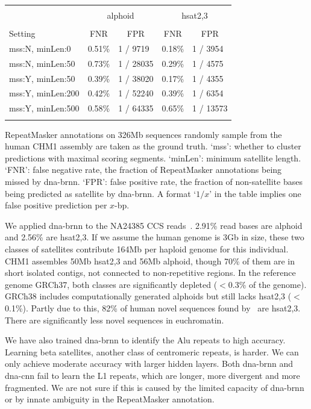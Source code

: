 \documentclass{bioinfo}
\begin{document}
\begin{table}[tb]
{\footnotesize
\begin{tabular}{p{3.3cm}rlrl}
\toprule\\[-1.5em]
& \multicolumn{2}{c}{\vspace{0.3em}alphoid} & \multicolumn{2}{c}{hsat2,3} \\
\cline{2-5}\\[-0.7em]
Setting & \multicolumn{1}{c}{FNR} & \multicolumn{1}{c}{FPR} & \multicolumn{1}{c}{FNR} & \multicolumn{1}{c}{FPR} \\[-0.5em]
\midrule
mss:N, minLen:0 & 0.51\% & 1 / 9719  & 0.18\% & 1 / 3954 \\
mss:N, minLen:50& 0.73\% & 1 / 28035 & 0.29\% & 1 / 4575 \\
mss:Y, minLen:50& 0.39\% & 1 / 38020 & 0.17\% & 1 / 4355 \\
mss:Y, minLen:200&0.42\% & 1 / 52240 & 0.39\% & 1 / 6354 \\
mss:Y, minLen:500&0.58\% & 1 / 64335 & 0.65\% & 1 / 13573 \\
\botrule
\end{tabular}
}{RepeatMasker annotations on 326Mb sequences randomly sample from the human
CHM1 assembly are taken as the ground truth. `mss': whether to cluster
predictions with maximal scoring segments.  `minLen': minimum satellite length.
`FNR': false negative rate, the fraction of RepeatMasker annotations being missed
by dna-brnn. `FPR': false positive rate, the fraction of non-satellite bases
being predicted as satellite by dna-brnn. A format `$1/x$' in the table implies
one false positive prediction per $x$-bp.}\label{tab:eval}
\end{table}

We applied dna-brnn to the NA24385 CCS reads~\citep{Wenger519025}. 2.91\% read
bases are alphoid and 2.56\% are hsat2,3. If we assume the human genome is 3Gb
in size, these two classes of satellites contribute 164Mb per haploid genome
for this individual. CHM1 assembles 50Mb hsat2,3 and 56Mb alphoid, though 70\%
of them are in short isolated contigs, not connected to non-repetitive regions.
In the reference genome GRCh37, both classes are significantly depleted ($<$0.3\% of the genome).
GRCh38 includes computationally
generated alphoids but still lacks hsat2,3 ($<$0.1\%). Partly due to this,
82\% of human novel sequences found by~\citet{Sherman:2018aa} are hsat2,3.
There are significantly less novel sequences in euchromatin.

We have also trained dna-brnn to identify the Alu repeats to high accuracy.
Learning beta satellites, another class of centromeric repeats, is harder. We
can only achieve moderate accuracy with larger hidden layers. Both dna-brnn
and dna-cnn fail to learn the L1 repeats, which are longer, more divergent and
more fragmented. We are not sure if this is caused by the limited capacity of
dna-brnn or by innate ambiguity in the RepeatMasker annotation.
\end{document}
